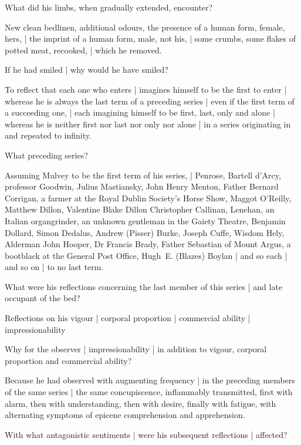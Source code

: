 What did his limbs,
when gradually extended,
encounter?

\Poetry[~(emotion)]
New clean bedlinen,
additional odours,
the presence of a human form, female, hers, |
the imprint of a human form, male, not his, |
some crumbs, some flakes of potted meat, recooked, |
which he removed.


If he had smiled |
why would he have smiled?

\Philosophy
To reflect that each one who enters |
imagines himself to be the first to enter |
whereas he is always the last term of a preceding series |
even if the first term of a succeeding one, |
each imagining himself to be first, last, only and alone |
whereas he is neither first nor last nor only nor alone |
in a series originating in and repeated to infinity.


What preceding series?

\Science
Assuming Mulvey to be the first term of his series, |
Penrose,
Bartell d'Arcy,
professor Goodwin,
Julius Mastiansky,
John Henry Menton,
Father Bernard Corrigan,
a farmer at the Royal Dublin Society's Horse Show,
Maggot O'Reilly,
Matthew Dillon,
Valentine Blake Dillon
Christopher Callinan,
Lenehan,
an Italian organgrinder,
an unknown gentleman in the Gaiety Theatre,
Benjamin Dollard,
Simon Dedalus,
Andrew (Pisser) Burke,
Joseph Cuffe,
Wisdom Hely,
Alderman John Hooper,
Dr Francis Brady,
Father Sebastian of Mount Argus,
a bootblack at the General Post Office,
Hugh~E. (Blazes) Boylan |
and so each |
and so on |
to no last term.


What were his reflections concerning the last member of this series |
and late occupant of the bed?

\Philosophy
Reflections on his vigour
 |
corporal proportion
 |
commercial ability
 |
impressionability


Why for the observer |
impressionability |
in addition to vigour, corporal proportion and commercial ability?

\Poetry[~(emotion)]
Because he had observed with augmenting frequency |
in the preceding members of the same series |
the same concupiscence,
inflammably transmitted,
first with alarm,
then with understanding,
then with desire,
finally with fatigue,
with alternating symptoms of epicene comprehension and apprehension.


With what antagonistic sentiments |
were his subsequent reflections |
affected?

